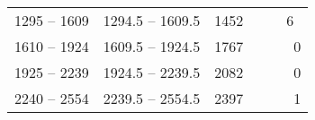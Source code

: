 \documentclass[]{book}
\begin{document}
\begin{longtable}[]{@{}lllll@{}}
\begin{minipage}[t]{0.18\columnwidth}
1295 -- 1609\strut
\end{minipage} & \begin{minipage}[t]{0.23\columnwidth}\raggedright
1294.5 -- 1609.5\strut
\end{minipage} & \begin{minipage}[t]{0.13\columnwidth}\raggedright
1452\strut
\end{minipage} & \begin{minipage}[t]{0.10\columnwidth}\raggedright
~\strut
\end{minipage} & \begin{minipage}[t]{0.14\columnwidth}\raggedright
6\strut
\end{minipage}\tabularnewline
\begin{minipage}[t]{0.18\columnwidth}\raggedright
1610 -- 1924\strut
\end{minipage} & \begin{minipage}[t]{0.23\columnwidth}\raggedright
1609.5 -- 1924.5\strut
\end{minipage} & \begin{minipage}[t]{0.13\columnwidth}\raggedright
1767\strut
\end{minipage} & \begin{minipage}[t]{0.10\columnwidth}\raggedright
~\strut
\end{minipage} & \begin{minipage}[t]{0.14\columnwidth}\raggedright
~0\strut
\end{minipage}\tabularnewline
\begin{minipage}[t]{0.18\columnwidth}\raggedright
1925 -- 2239\strut
\end{minipage} & \begin{minipage}[t]{0.23\columnwidth}\raggedright
1924.5 -- 2239.5\strut
\end{minipage} & \begin{minipage}[t]{0.13\columnwidth}\raggedright
2082\strut
\end{minipage} & \begin{minipage}[t]{0.10\columnwidth}\raggedright
\strut
\end{minipage} & \begin{minipage}[t]{0.14\columnwidth}\raggedright
~0\strut
\end{minipage}\tabularnewline
\begin{minipage}[t]{0.18\columnwidth}\raggedright
2240 -- 2554\strut
\end{minipage} & \begin{minipage}[t]{0.23\columnwidth}\raggedright
2239.5 -- 2554.5\strut
\end{minipage} & \begin{minipage}[t]{0.13\columnwidth}\raggedright
2397\strut
\end{minipage} & \begin{minipage}[t]{0.10\columnwidth}\raggedright
~~\strut
\end{minipage} & \begin{minipage}[t]{0.14\columnwidth}\raggedright
~1\strut
\end{minipage}\tabularnewline
\bottomrule
\end{longtable}
\end{document}
